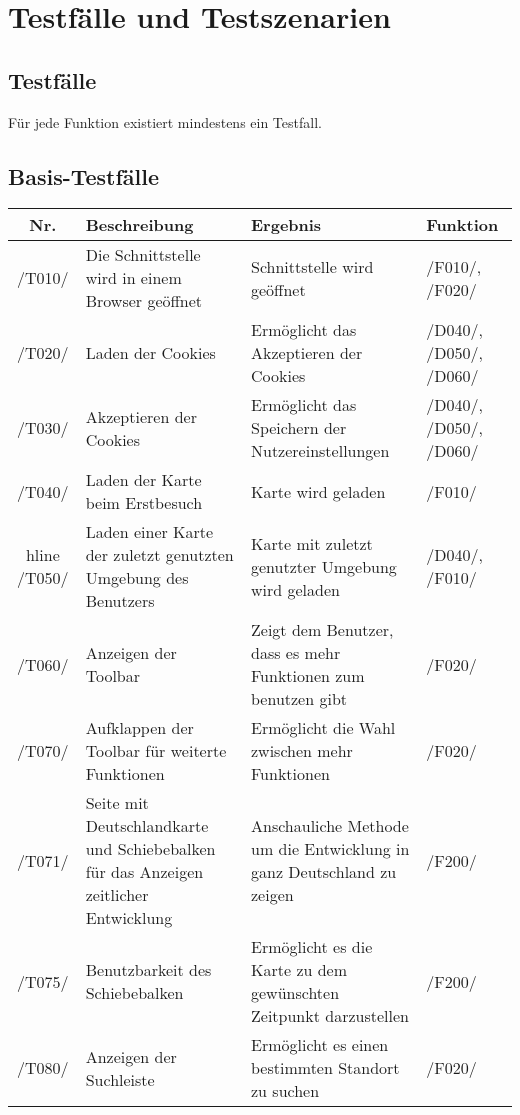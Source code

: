 \section{Testfälle und Testszenarien}
\subsection{Testfälle}

Für jede Funktion existiert mindestens ein Testfall.
\newline
\subsection{Basis-Testfälle}
\begin{tabularx}{\textwidth}{| c | X | X | X |}
    \hline
    \textbf{Nr.} & 
    \textbf{Beschreibung} &
    \textbf{Ergebnis} &
    \textbf{Funktion}\\
    \hline
    /T010/ & Die Schnittstelle wird in einem Browser geöffnet & Schnittstelle wird geöffnet & /F010/, /F020/ \\
    \hline
    /T020/ & Laden der \glspl{Cookie} & Ermöglicht das Akzeptieren der \glspl{Cookie} & /D040/, /D050/, /D060/ \\
    \hline
    /T030/ & Akzeptieren der \glspl{Cookie} & Ermöglicht das Speichern der Nutzereinstellungen & /D040/, /D050/, /D060/ \\
    \hline
    /T040/ & Laden der Karte beim Erstbesuch & Karte wird geladen & /F010/ \\
     hline
    /T050/ & Laden einer Karte der zuletzt genutzten Umgebung des Benutzers & Karte mit zuletzt genutzter Umgebung wird geladen & /D040/, /F010/ \\
    \hline
    /T060/ & Anzeigen der \gls{Toolbar} & Zeigt dem Benutzer, dass es mehr Funktionen zum benutzen gibt & /F020/ \\
    \hline
    /T070/ & Aufklappen der \gls{Toolbar} für weiterte Funktionen & Ermöglicht die Wahl zwischen mehr Funktionen & /F020/ \\
    \hline
    /T071/ & Seite mit Deutschlandkarte und Schiebebalken für das Anzeigen zeitlicher Entwicklung & Anschauliche Methode um die Entwicklung in ganz Deutschland zu zeigen & /F200/ \\
    \hline
    /T075/ & Benutzbarkeit des Schiebebalken & Ermöglicht es die Karte zu dem gewünschten Zeitpunkt darzustellen & /F200/ \\
    \hline
    /T080/ & Anzeigen der Suchleiste & Ermöglicht es einen bestimmten Standort zu suchen & /F020/ \\

\end{tabularx}
